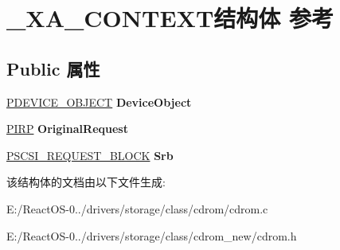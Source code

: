 \hypertarget{struct___x_a___c_o_n_t_e_x_t}{}\section{\+\_\+\+X\+A\+\_\+\+C\+O\+N\+T\+E\+X\+T结构体 参考}
\label{struct___x_a___c_o_n_t_e_x_t}
\subsection*{Public 属性}
\begin{DoxyCompactItemize}
\item 
\mbox{\label{struct___x_a___c_o_n_t_e_x_t_ac66013daa2d546f959f7d49d2149f2e2}} 
\hyperlink{struct___d_e_v_i_c_e___o_b_j_e_c_t}{P\+D\+E\+V\+I\+C\+E\+\_\+\+O\+B\+J\+E\+CT} {\bfseries Device\+Object}
\item 
\mbox{\label{struct___x_a___c_o_n_t_e_x_t_a9c6ebc6459e35b53337854e3e653def9}} 
\hyperlink{interfacevoid}{P\+I\+RP} {\bfseries Original\+Request}
\item 
\mbox{\label{struct___x_a___c_o_n_t_e_x_t_aa190b8aa0df3e54f8c6f909d77a3fed8}} 
\hyperlink{struct___s_c_s_i___r_e_q_u_e_s_t___b_l_o_c_k}{P\+S\+C\+S\+I\+\_\+\+R\+E\+Q\+U\+E\+S\+T\+\_\+\+B\+L\+O\+CK} {\bfseries Srb}
\end{DoxyCompactItemize}


该结构体的文档由以下文件生成\+:\begin{DoxyCompactItemize}
\item 
E\+:/\+React\+O\+S-\/0../drivers/storage/class/cdrom/cdrom.\+c\item 
E\+:/\+React\+O\+S-\/0../drivers/storage/class/cdrom\+\_\+new/cdrom.\+h\end{DoxyCompactItemize}
